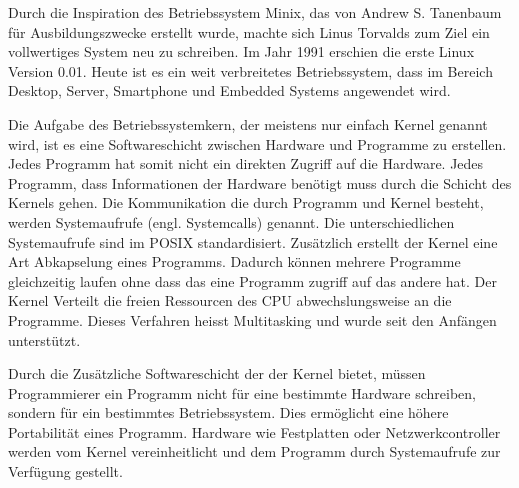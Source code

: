 Durch die Inspiration des Betriebssystem Minix, das von Andrew S. Tanenbaum für Ausbildungszwecke erstellt wurde, machte sich Linus Torvalds zum Ziel ein vollwertiges System neu zu schreiben. Im Jahr 1991 erschien die erste Linux Version 0.01\cite{ehses2011systemprogrammierung_chap2}. Heute ist es ein weit verbreitetes Betriebssystem, dass im Bereich Desktop, Server, Smartphone und Embedded Systems angewendet wird.
\par
Die Aufgabe des Betriebssystemkern, der meistens nur einfach Kernel genannt wird, ist es eine Softwareschicht zwischen Hardware und Programme zu erstellen. Jedes Programm hat somit nicht ein direkten Zugriff auf die Hardware. Jedes Programm, dass Informationen der Hardware benötigt muss durch die Schicht des Kernels gehen. Die Kommunikation die durch Programm und Kernel besteht, werden Systemaufrufe (engl. Systemcalls) genannt. Die unterschiedlichen Systemaufrufe sind im POSIX standardisiert\cite{ehses2011systemprogrammierung_chap2}. Zusätzlich erstellt der Kernel eine Art Abkapselung eines Programms. Dadurch können mehrere Programme gleichzeitig laufen ohne dass das eine Programm zugriff auf das andere hat. Der Kernel Verteilt die freien Ressourcen des CPU abwechslungsweise an die Programme. Dieses Verfahren heisst Multitasking und wurde seit den Anfängen unterstützt.
\par
Durch die Zusätzliche Softwareschicht der der Kernel bietet, müssen Programmierer ein Programm nicht für eine bestimmte Hardware schreiben, sondern für ein bestimmtes Betriebssystem. Dies ermöglicht eine höhere Portabilität eines Programm. Hardware wie Festplatten oder Netzwerkcontroller werden vom Kernel vereinheitlicht und dem Programm durch Systemaufrufe zur Verfügung gestellt.
\par

